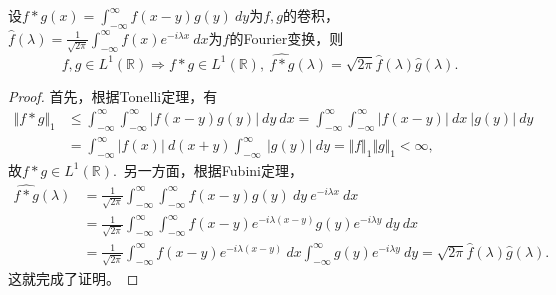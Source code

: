 \documentclass[color=green,thmcnt=section,lang=cn,12pt]{elegantbook}
\numberwithin{equation}{section}%
\numberwithin{figure}{section}%
\newcommand{\RR}{\mathbb{R}}
\newcommand{\normp}[2]{\Vert #1 \Vert_{#2}}
\begin{document}
\begin{example}
    设$f*g(x)=\int_{-\infty}^{\infty}f(x-y)g(y)\ dy$为$f,g$的卷积，$\hat{f}(\lambda)=\frac{1}{\sqrt{2\pi}}\int_{-\infty}^{\infty}f(x)e^{-i\lambda x}\ dx$为$f$的Fourier变换，则
    \begin{equation*}
       f,g\in L^1(\RR)\Longrightarrow f*g\in L^1(\RR),\  \widehat{f*g}(\lambda)=\sqrt{2\pi}\hat{f}(\lambda)\hat{g}(\lambda).
    \end{equation*}
\end{example}
\begin{proof}
    首先，根据Tonelli定理，有\begin{equation*}
\begin{aligned}
            \normp{f*g}{1} &\leq \int_{-\infty}^{\infty}\int_{-\infty}^{\infty}|f(x-y)g(y)|\ dy\ dx =
            \int_{-\infty}^{\infty}\int_{-\infty}^{\infty}|f(x-y)|\ dx\ |g(y)|\ dy\\
            &= \int_{-\infty}^{\infty}|f(x)|\ d(x+y)\int_{-\infty}^{\infty}\ |g(y)|\ dy=\normp{f}{1}\normp{g}{1}<\infty,
\end{aligned}
    \end{equation*}
    故$f*g\in L^1(\RR)$.\ 另一方面，根据Fubini定理，
    \begin{equation*}
\begin{aligned}
            \widehat{f*g}(\lambda)&=\frac{1}{\sqrt{2\pi}}\int_{-\infty}^{\infty}\int_{-\infty}^{\infty}f(x-y)g(y)\ dy\ e^{-i\lambda x}\ dx\\
            &=\frac{1}{\sqrt{2\pi}}\int_{-\infty}^{\infty}\int_{-\infty}^{\infty}f(x-y)e^{-i\lambda(x-y)}g(y) e^{-i\lambda y}\ dy\ dx\\
            &=\frac{1}{\sqrt{2\pi}}\int_{-\infty}^{\infty}f(x-y)e^{-i\lambda(x-y)} \ dx \int_{-\infty}^{\infty} g(y)e^{-i\lambda y}\ dy
            =\sqrt{2\pi}\hat{f}(\lambda)\hat{g}(\lambda).
\end{aligned}
    \end{equation*}
    这就完成了证明。
\end{proof}
\ 
\end{document}
